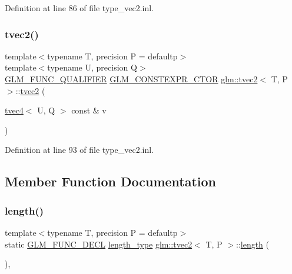 Definition at line 86 of file type\+\_\+vec2.\+inl.

\mbox{\label{structglm_1_1tvec2_a5837d885dadb1fdca54974c65166a8b4}} 
\subsubsection{\texorpdfstring{tvec2()}{tvec2()}\hspace{0.1cm}{\footnotesize\ttfamily [17/17]}}
{\footnotesize\ttfamily template$<$typename T, precision P = defaultp$>$ \\
template$<$typename U, precision Q$>$ \\
\mbox{\hyperlink{setup_8hpp_a33fdea6f91c5f834105f7415e2a64407}{G\+L\+M\+\_\+\+F\+U\+N\+C\+\_\+\+Q\+U\+A\+L\+I\+F\+I\+ER}} \mbox{\hyperlink{setup_8hpp_ad34178a09666081abdb573c14d1f4a5a}{G\+L\+M\+\_\+\+C\+O\+N\+S\+T\+E\+X\+P\+R\+\_\+\+C\+T\+OR}} \mbox{\hyperlink{structglm_1_1tvec2}{glm\+::tvec2}}$<$ T, P $>$\+::\mbox{\hyperlink{structglm_1_1tvec2}{tvec2}} (\begin{DoxyParamCaption}\item[{\mbox{\hyperlink{structglm_1_1tvec4}{tvec4}}$<$ U, Q $>$ const \&}]{v }\end{DoxyParamCaption})}



Definition at line 93 of file type\+\_\+vec2.\+inl.



\subsection{Member Function Documentation}
\mbox{\label{structglm_1_1tvec2_a646329366ca3d3874854a5445aefd4ae}} 
\subsubsection{\texorpdfstring{length()}{length()}}
{\footnotesize\ttfamily template$<$typename T, precision P = defaultp$>$ \\
static \mbox{\hyperlink{setup_8hpp_ab2d052de21a70539923e9bcbf6e83a51}{G\+L\+M\+\_\+\+F\+U\+N\+C\+\_\+\+D\+E\+CL}} \mbox{\hyperlink{structglm_1_1tvec2_a5a5ddebab821a3cf9185772386afbe8d}{length\+\_\+type}} \mbox{\hyperlink{structglm_1_1tvec2}{glm\+::tvec2}}$<$ T, P $>$\+::\mbox{\hyperlink{glad_8h_a1499969c13207ed8ab6f796685d4933f}{length}} (\begin{DoxyParamCaption}{ }\end{DoxyParamCaption})\hspace{0.3cm}{\ttfamily [inline]}, {\ttfamily [static]}}




